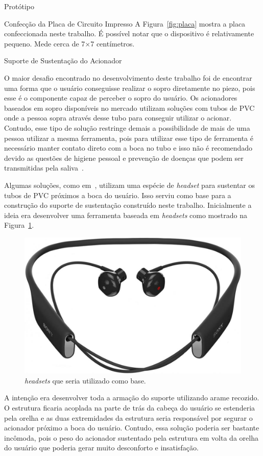 \begin{chapter}{Protótipo}
\begin{section}{Confecção da Placa de Circuito Impresso}
A Figura~\ref{fig:placa} mostra a placa confeccionada neste trabalho. É possível
notar que o dispositivo é relativamente pequeno. Mede cerca de 7$\times$7
centímetros.       


\end{section}


\begin{section}{Suporte de Sustentação do Acionador}

O maior desafio encontrado no desenvolvimento deste trabalho foi de encontrar
uma forma que o usuário conseguisse realizar o sopro diretamente no piezo, pois 
esse é o componente capaz de perceber o sopro do usuário. Os acionadores
baseados em sopro disponíveis no mercado utilizam soluções com tubos de PVC onde
a pessoa sopra através desse tubo para conseguir utilizar o acionar. Contudo,
esse tipo de solução restringe demais a possibilidade de mais de uma pessoa
utilizar a mesma ferramenta, pois para utilizar esse tipo de ferramenta é
necessário manter contato direto com a boca no tubo e isso não é recomendado
devido as questões de higiene pessoal e prevenção de doenças que podem ser 
transmitidas pela saliva~\cite{Li2000}.

Algumas soluções, como em~\cite{CorpPuff}, utilizam uma espécie de 
\textit{headset} para sustentar os tubos de PVC próximos a boca do usuário. Isso
serviu como base para a construção do suporte de sustentação construído neste
trabalho. Inicialmente a ideia era desenvolver uma ferramenta baseada em
\textit{headsets} como mostrado na Figura~\ref{fig:headset}.

\begin{figure}[!h]
	\centering
	\begin{minipage}[c]{\textwidth}
	\centering
	\includegraphics[width=0.4\linewidth]{fig/heaset}
	\caption{\textit{headsets} que seria utilizado como base.}
	\label{fig:headset}
	\end{minipage}
\end{figure} 

A intenção era desenvolver toda a armação do suporte utilizando arame recozido.
O estrutura ficaria acoplada na parte de trás da cabeça do usuário se estenderia
pela orelha e as duas extremidades da estrutura seria responsável por segurar o
acionador próximo a boca do usuário. Contudo, essa solução poderia ser
bastante incômoda, pois o peso do acionador sustentado pela estrutura em volta
da orelha do usuário que poderia gerar muito desconforto e insatisfação.


\end{section}
\end{chapter}
